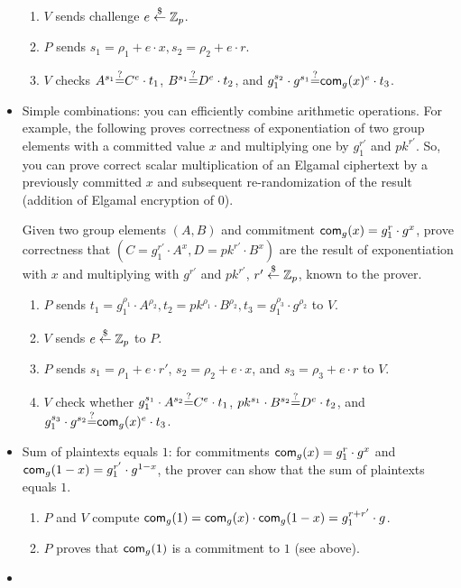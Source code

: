 \begin{itemize}
\begin{enumerate}
      \item $V$ sends challenge $e\stackrel{\$}{\leftarrow}\mathbb{Z}_p$.

      \item $P$ sends $s_1=\rho_1+e\cdot{}x,s_2=\rho_2+e\cdot{}r$.
        \item $V$ checks $A^{s_1}{\stackrel{?}{=}}{}C^e\cdot{}t_1$,
          $B^{s_1}{\stackrel{?}{=}}{}D^e\cdot{}t_2$, and
          $g_1^{s_2}\cdot{}g^{s_1}{\stackrel{?}{=}}{}\mathsf{com}_g(x)^e\cdot{}t_3$.
          
      \end{enumerate}   

    \item Simple combinations: you can efficiently combine arithmetic
      operations. For example, the following proves correctness of
      exponentiation of two group elements with a committed value $x$
      and multiplying one by $g_1^{r'}$ and $pk^{r'}$. So, you can
      prove correct scalar multiplication of an Elgamal ciphertext by
      a previously committed $x$ and subsequent re-randomization of
      the result (addition of Elgamal encryption of $0$).

      Given two group elements $(A,B)$ and commitment
      $\mathsf{com}_g(x) =g_1^{r}\cdot{}g^x$, prove correctness that
      $(C=g_1^{r'}\cdot{}A^x,D=pk^{r'}\cdot{}B^x)$ are the result of
      exponentiation with $x$ and multiplying with $g^{r'}$ and
      $pk^{r'}$, $r'\stackrel{\$}{\leftarrow}\mathbb{Z}_p$, known to the prover.

\begin{enumerate}
  \item $P$ sends $t_1=g_1^{\rho_1}\cdot{}A^{\rho_2},t_2=pk^{\rho_1}\cdot{}B^{\rho_2},t_3=g_1^{\rho_3}\cdot{}g^{\rho_2}$ to $V$.
  \item $V$ sends $e\stackrel{\$}{\leftarrow}\mathbb{Z}_p$ to $P$.
    \item $P$ sends $s_1=\rho_1+e\cdot{}r'$, $s_2=\rho_2+e\cdot{}x$,
      and $s_3=\rho_3+e\cdot{}r$ to $V$.
\item $V$ check whether $g_1^{s_1}\cdot{}A^{s_2}{\stackrel{?}{=}}{}C^e\cdot{}t_1$,
  $pk^{s_1}\cdot{}B^{s_2}{\stackrel{?}{=}}{}D^e\cdot{}t_2$, and
  $g_1^{s_3}\cdot{}g^{s_2}{\stackrel{?}{=}}{}\mathsf{com}_g(x)^e\cdot{}t_3$.
\end{enumerate}

\item Sum of plaintexts equals $1$: for commitments
  $\mathsf{com}_{g}(x)=g_1^r\cdot{}g^x$ and
  $\mathsf{com}_{g}(1-x)=g_1^{r'}\cdot{}g^{1-x}$, the prover can show that the sum of
  plaintexts equals $1$.

  \begin{enumerate}
  \item $P$ and $V$ compute
    $\mathsf{com}_{g}(1)=\mathsf{com}_{g}(x)\cdot{}\mathsf{com}_{g}(1-x)=g_1^{r+r'}\cdot{}g$.
\item $P$ proves that $\mathsf{com}_{g}(1)$ is a commitment to $1$ (see
  above).
  \end{enumerate}
\item {}
\end{itemize}

